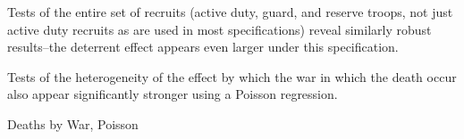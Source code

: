 \documentclass[12pt] {article}
\begin{document}
Tests of the entire set of recruits (active duty, guard, and reserve troops, not just active duty recruits as are used in most specifications) reveal similarly robust results--the deterrent effect appears even larger under this specification.

\begin{table}
\caption{}
\label{Flo:allrecruits}
\scalebox{0.8}{
}
\end{table}

Tests of the heterogeneity of the effect by which the war in which the death occur also appear significantly stronger using a Poisson regression.

\begin{table}
\caption{Deaths by War, Poisson}
\label{Flo:Deaths by WarP}

\end{table}


\end{document}
